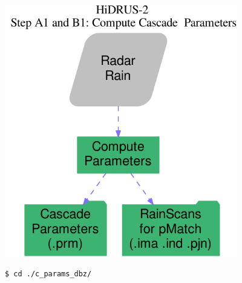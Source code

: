 \documentclass[12pt, a4paper]{extarticle}
\begin{document}
\includegraphics[width=4in]{./fig/casc_prm.pdf}
 
 
\begin{lstlisting}[style=BashInputStyle]
	$ cd ./c_params_dbz/
\end{lstlisting}
\end{document}
